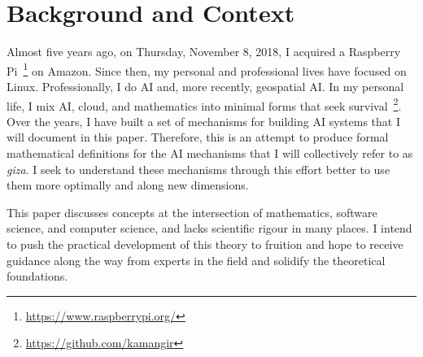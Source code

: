 \section{Background and Context}

Almost five years ago, on Thursday, November 8, 2018, I acquired a Raspberry Pi~\footnote{\url{https://www.raspberrypi.org/}} on Amazon. Since then, my personal and professional lives have focused on Linux. Professionally, I do AI and, more recently, geospatial AI. In my personal life, I mix AI, cloud, and mathematics into minimal forms that seek survival~\footnote{\url{https://github.com/kamangir}}. Over the years, I have built a set of mechanisms for building AI systems that I will document in this paper. Therefore, this is an attempt to produce formal mathematical definitions for the AI mechanisms that I will collectively refer to as \emph{giza}. I seek to understand these mechanisms through this effort better to use them more optimally and along new dimensions.

This paper discusses concepts at the intersection of mathematics, software science, and computer science, and lacks scientific rigour in many places. I intend to push the practical development of this theory to fruition and hope to receive guidance along the way from experts in the field and solidify the theoretical foundations.